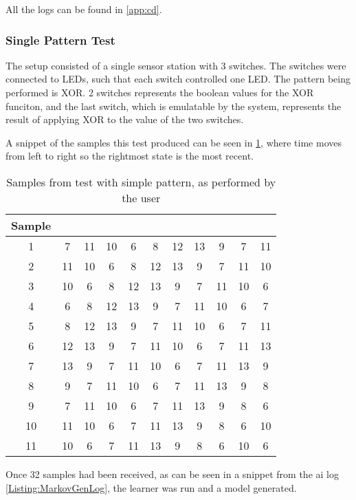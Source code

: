 All the logs can be found in \cref{app:cd}. 
\subsubsection{Single Pattern Test}\label{subsec:singlePatternTest}
The setup consisted of a single sensor station with 3 switches. The switches were connected to LEDs, such that each switch controlled one LED. The pattern being performed is XOR. 2 switches represents the boolean values for the XOR funciton, and the last switch, which is emulatable by the system, represents the result of applying XOR to the value of the two switches.

A snippet of the samples this test produced can be seen in \cref{Table:SampleSnippet}, where time moves from left to right so the rightmost state is the most recent.
\begin{center}

\begin{table}[htbp]
  \centering
  \begin{tabular}{c c c c c c c c c c c}
    \toprule
    Sample & & & & & & & & & &  \\ \midrule
           1 & 7 & 11 & 10 & 6 & 8 & 12 & 13 & 9 & 7 & 11 \\
           2 & 11 & 10 & 6 & 8 & 12 & 13 & 9 & 7 & 11 & 10 \\
           3 & 10 & 6 & 8 & 12 & 13 & 9 & 7 & 11 & 10 & 6 \\
           4 & 6  & 8 & 12 & 13 & 9 & 7 & 11 & 10 & 6 & 7 \\
           5 & 8 & 12 & 13 & 9 & 7 & 11 & 10 & 6 & 7 & 11 \\
           6 & 12 & 13 & 9 & 7 & 11 & 10 & 6 & 7 & 11 & 13 \\
           7 & 13 & 9 & 7 & 11 & 10 & 6 & 7 & 11 & 13 & 9 \\
           8 & 9 & 7 & 11 & 10 & 6 & 7 & 11 & 13 & 9 & 8 \\
           9 & 7 & 11 & 10 & 6 & 7 & 11 & 13 & 9 & 8 & 6 \\
           10& 11 & 10 & 6 & 7 & 11 & 13 & 9 & 8 & 6 & 10 \\
           11 & 10 & 6 & 7 & 11 & 13 & 9 & 8 & 6 & 10 & 6
     \\ \bottomrule
  \end{tabular}
  \caption{Samples from test with simple pattern, as performed by the user}\label{Table:SampleSnippet}
\end{table}
\end{center}
Once 32 samples had been received, as can be seen in a snippet from the ai log \cref{Listing:MarkovGenLog}, the learner was run and a model generated.

